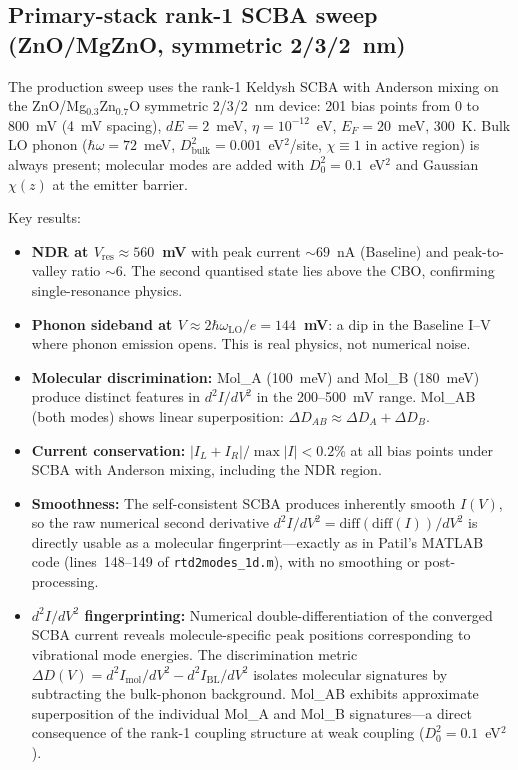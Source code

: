 \documentclass[11pt,a4paper,onecolumn]{article}
\newcommand{\code}[1]{\texttt{\small #1}}
\begin{document}
\subsection{Primary-stack rank-1 SCBA sweep (ZnO/MgZnO, symmetric 2/3/2~nm)}
\label{sec:results-primary}
The production sweep uses the rank-1 Keldysh SCBA with Anderson mixing on the
ZnO/Mg$_{0.3}$Zn$_{0.7}$O symmetric 2/3/2~nm device: 201 bias points from
0 to 800~mV (4~mV spacing), $dE = 2$~meV, $\eta = 10^{-12}$~eV, $E_F = 20$~meV, 300~K.
Bulk LO phonon ($\hbar\omega = 72$~meV, $D^2_{\mathrm{bulk}} = 0.001$~eV$^2$/site,
$\chi \equiv 1$ in active region) is always present; molecular modes are
added with $D^2_0 = 0.1$~eV$^2$ and Gaussian $\chi(z)$ at the emitter
barrier.

Key results:
\begin{itemize}[leftmargin=1.3em,itemsep=0pt]
\item \textbf{NDR at $V_{\mathrm{res}} \approx 560$~mV} with peak current
$\sim 69$~nA (Baseline) and peak-to-valley ratio $\sim 6$. The second
quantised state lies above the CBO, confirming single-resonance physics.
\item \textbf{Phonon sideband at $V \approx 2 \hbar\omega_{\mathrm{LO}}/e = 144$~mV}:
a dip in the Baseline I--V where phonon emission opens. This is real physics,
not numerical noise.
\item \textbf{Molecular discrimination:} Mol\_A (100~meV) and Mol\_B (180~meV)
produce distinct features in $d^2I/dV^2$ in the 200--500~mV range.
Mol\_AB (both modes) shows linear superposition:
$\Delta D_{AB} \approx \Delta D_A + \Delta D_B$.
\item \textbf{Current conservation:} $|I_L + I_R|/\max|I| < 0.2$\% at all
bias points under SCBA with Anderson mixing, including the NDR region.
\item \textbf{Smoothness:} The self-consistent SCBA produces inherently
smooth $I(V)$, so the raw numerical second derivative
$d^2I/dV^2 = \mathrm{diff}(\mathrm{diff}(I))/dV^2$ is directly usable as a
molecular fingerprint---exactly as in Patil's MATLAB code (lines~148--149 of
\code{rtd2modes\_1d.m}), with no smoothing or post-processing.
\item \textbf{$d^2I/dV^2$ fingerprinting:} Numerical double-differentiation
of the converged SCBA current reveals molecule-specific peak positions
corresponding to vibrational mode energies. The discrimination metric
$\Delta D(V) = d^2I_{\mathrm{mol}}/dV^2 - d^2I_{\mathrm{BL}}/dV^2$
isolates molecular signatures by subtracting the bulk-phonon background.
Mol\_AB exhibits approximate superposition of the individual Mol\_A and
Mol\_B signatures---a direct consequence of the rank-1 coupling structure
at weak coupling ($D_0^2 = 0.1$~eV$^2$).
\end{itemize}
\end{document}
